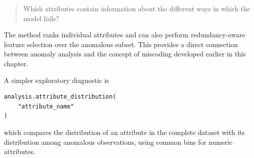 \begin{quote}
Which attributes contain information about the different ways in which the
model fails?
\end{quote}

The method ranks individual attributes and can also perform redundancy-aware
feature selection over the anomalous subset. This provides a direct connection
between anomaly analysis and the concept of miscoding developed earlier in this
chapter.

A simpler exploratory diagnostic is

\begin{sourcecode}
{\scriptsize
\begin{verbatim}
analysis.attribute_distribution(
    "attribute_name"
)
\end{verbatim}}
\end{sourcecode}

which compares the distribution of an attribute in the complete dataset with
its distribution among anomalous observations, using common bins for numeric
attributes.

